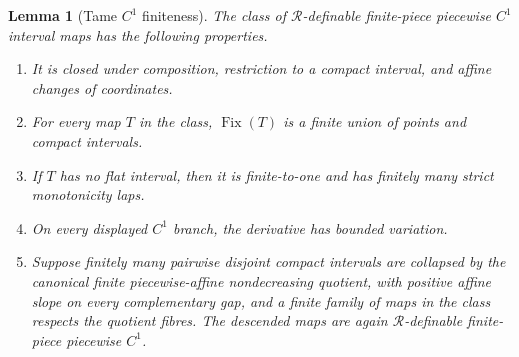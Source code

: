 \documentclass[11pt]{article}
\newtheorem{lemma}[theorem]{Lemma}
\theoremstyle{definition}
\theoremstyle{remark}
\newcommand{\Fix}{\operatorname{Fix}}
\begin{document}
\begin{lemma}[Tame \(C^1\) finiteness]\label{lem:analytic-finiteness}
The class of \(\mathcal R\)-definable finite-piece piecewise \(C^1\) interval
maps has the
following properties.
\begin{enumerate}
\item It is closed under composition, restriction to a compact interval, and
affine changes of coordinates.
\item For every map \(T\) in the class, \(\Fix(T)\) is a finite union of
points and compact intervals.
\item If \(T\) has no flat interval, then it is finite-to-one and has finitely
many strict monotonicity laps.
\item On every displayed \(C^1\) branch, the derivative has bounded
variation.
\item Suppose finitely many pairwise disjoint compact intervals are collapsed
by the canonical finite piecewise-affine nondecreasing quotient, with positive
affine slope on every complementary gap, and a finite family of maps in the
class respects the quotient fibres.  The descended maps are again
\(\mathcal R\)-definable finite-piece piecewise \(C^1\).
\end{enumerate}
\end{lemma}
\end{document}
